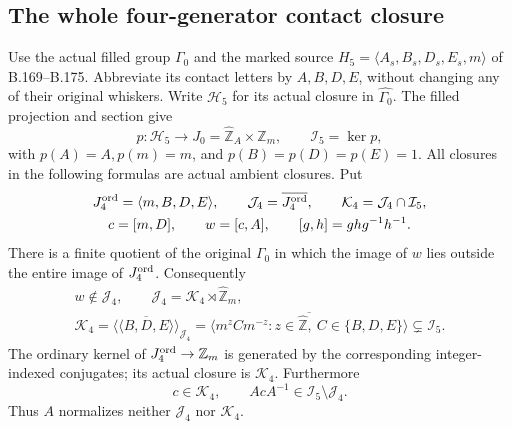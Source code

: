 \subsection*{The whole four-generator contact closure}
\label{stmt:B176}
Use the actual filled group \(\Gamma _0\) and the marked source
\(H_5=\langle A_s,B_s,D_s,E_s,m\rangle\) of B.169--B.175.
Abbreviate its contact letters by \(A,B,D,E\), without changing any
of their original whiskers. Write \(\mathcal H_5\) for its actual
closure in \(\widehat{\Gamma _0}\). The filled projection and section give
\[
 p:\mathcal H_5\longrightarrow
 J_0=\widehat{\mathbb Z}_A\times\widehat{\mathbb Z}_m,
 \qquad
 \mathcal I_5=\ker p,
\]
with \(p(A)=A,p(m)=m\), and \(p(B)=p(D)=p(E)=1\).
All closures in the following formulas are actual ambient closures.
Put
\[
 \begin{gathered}
 J_4^{\rm ord}=\langle m,B,D,E\rangle,\qquad
 \mathcal J_4=\overline{J_4^{\rm ord}},\qquad
 \mathcal K_4=\mathcal J_4\cap\mathcal I_5,\\
 c=[m,D],\qquad w=[c,A],\qquad [g,h]=ghg^{-1}h^{-1}.
 \end{gathered}
\]
There is a finite quotient of the original \(\Gamma _0\) in which the
image of \(w\) lies outside the entire image of \(J_4^{\rm ord}\).
Consequently
\begin{equation}\label{eq:B176-kernel}
\begin{gathered}
 w\notin\mathcal J_4,\qquad
 \mathcal J_4=\mathcal K_4\rtimes\widehat{\mathbb Z}_m,\\
 \mathcal K_4
 =\overline{\langle\!\langle B,D,E\rangle\!\rangle}_{\mathcal J_4}
 =\overline{\langle m^z C m^{-z}:
              z\in\widehat{\mathbb Z},\ C\in\{B,D,E\}\rangle}
 \subsetneq\mathcal I_5.
\end{gathered}
\end{equation}
The ordinary kernel of \(J_4^{\rm ord}\to\mathbb Z_m\) is generated by
the corresponding integer-indexed conjugates; its actual closure is
\(\mathcal K_4\). Furthermore
\[
 c\in\mathcal K_4,\qquad AcA^{-1}\in\mathcal I_5\setminus\mathcal J_4.
\]
Thus \(A\) normalizes neither \(\mathcal J_4\) nor \(\mathcal K_4\).


